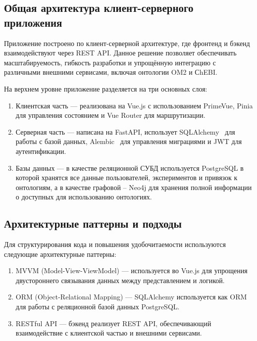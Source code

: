\setcounter{section}{3}
\setcounter{subsection}{0}
 \label{sec: 3}

\subsection{Общая архитектура клиент-серверного приложения}

Приложение построено по клиент-серверной архитектуре, где фронтенд и бэкенд взаимодействуют через REST API. Данное решение позволяет обеспечивать масштабируемость, гибкость разработки и упрощённую интеграцию с различными внешними сервисами, включая онтологии OM2 и СhEBI.

На верхнем уровне приложение разделяется на три основных слоя:
\begin{enumerate}
    \item Клиентская часть — реализована на Vue.js с использованием PrimeVue, Pinia для управления состоянием и Vue Router для маршрутизации.
    \item Серверная часть — написана на FastAPI, использует SQLAlchemy~\cite{Library:SQLAlchemy} для работы с базой данных, Alembic~\cite{Library:Alembic} для управления миграциями и JWT для аутентификации.
    \item Базы данных — в качестве реляционной СУБД используется PostgreSQL в которой хранятся все данные пользователей, экспериментов и привязок к онтологиям, а в качестве графовой – Neo4j для хранения полной информации о доступных для использованию онтологиях.
\end{enumerate}



\subsection{Архитектурные паттерны и подходы}

Для структурирования кода и повышения удобочитаемости используются следующие архитектурные паттерны:

\begin{enumerate}
    \item MVVM (Model-View-ViewModel) — используется во Vue.js для упрощения двустороннего связывания данных между представлением и логикой.
    \item ORM (Object-Relational Mapping) — SQLAlchemy используется как ORM для работы с реляционной базой данных PostgreSQL.
    \item RESTful API — бэкенд реализует REST API, обеспечивающий взаимодействие с клиентской частью и внешними сервисами.
\end{enumerate}

